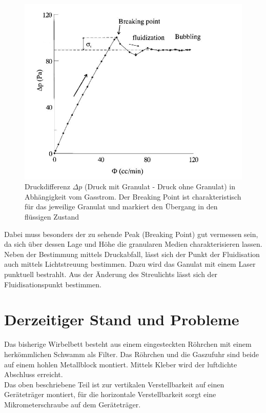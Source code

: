 \begin{figure}[h!]
	\begin{center}
		\includegraphics[scale=0.6]{Castellanos_Diagramm.jpg}
		\caption[Fluidisierungsdiagramm]{Druckdifferenz $\Delta p$ (Druck mit Granulat - Druck ohne Granulat) in Abhängigkeit vom Gasstrom. Der Breaking Point ist charakteristisch für das jeweilige Granulat und markiert den Übergang in den flüssigen Zustand \cite{Castellanos2000}}
	\end{center}
\end{figure}

Dabei muss besonders der zu sehende Peak (Breaking Point) gut vermessen sein, da sich über dessen Lage und Höhe die granularen Medien charakterisieren lassen. \\
Neben der Bestimmung mittels Druckabfall, lässt sich der Punkt der Fluidisation auch mittels Lichtstreuung bestimmen. Dazu wird das Ganulat mit einem Laser punktuell bestrahlt. Aus der Änderung des Streulichts lässt sich der Fluidisationspunkt bestimmen. 


\newpage

\section{Derzeitiger Stand und Probleme}


Das bisherige Wirbelbett besteht aus einem eingesteckten Röhrchen mit einem herkömmlichen Schwamm als Filter. Das Röhrchen und die Gaszufuhr sind beide auf einem hohlen Metallblock montiert. Mittels Kleber wird der luftdichte Abschluss erreicht. \\
Das oben beschriebene Teil ist zur vertikalen Verstellbarkeit auf einen Geräteträger montiert, für die horizontale Verstellbarkeit sorgt eine Mikrometerschraube auf dem Geräteträger. 

